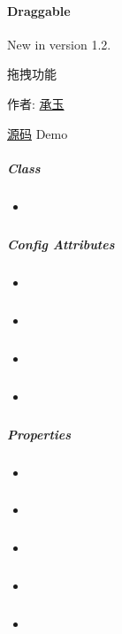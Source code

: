 \documentclass[letterpaper,10pt,english]{sphinxmanual}
\begin{document}
\paragraph{Draggable}
\label{api/component/dd/draggable:draggable}\label{api/component/dd/draggable::doc}New in version 1.2.
\begin{DUlineblock}{0em}
\item[] 拖拽功能
\item[] 作者: \href{mailto:yiminghe@gmail.com}{承玉}
\item[] \href{https://github.com/kissyteam/kissy/tree/master/src/dd/draggable.js}{源码} \textbar{} Demo
\end{DUlineblock}


\subparagraph{Class}
\label{api/component/dd/draggable:class}\begin{itemize}
\item {}
{\hyperref[api/component/dd/draggable:Draggable.Draggable]{}}

\end{itemize}


\subparagraph{Config Attributes}
\label{api/component/dd/draggable:config-attributes}\begin{itemize}
\item {}
{\hyperref[api/component/dd/draggable:Draggable.node]{}}

\item {}
{\hyperref[api/component/dd/draggable:Draggable.handlers]{}}

\item {}
{\hyperref[api/component/dd/draggable:Draggable.cursor]{}}

\item {}
{\hyperref[api/component/dd/draggable:Draggable.mode]{}}

\end{itemize}


\subparagraph{Properties}
\label{api/component/dd/draggable:properties}\begin{itemize}
\item {}
{\hyperref[api/component/dd/draggable:Draggable.POINT]{}}

\item {}
{\hyperref[api/component/dd/draggable:Draggable.INTERSECT]{}}

\item {}
{\hyperref[api/component/dd/draggable:Draggable.STRICT]{}}

\item {}
{\hyperref[api/component/dd/draggable:Draggable.node]{}}

\item {}
{\hyperref[api/component/dd/draggable:Draggable.dragNode]{}}

\end{itemize}
\end{document}
